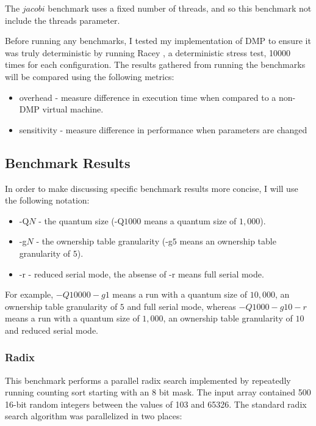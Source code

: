 The $jacobi$ benchmark uses a fixed number of threads, and so this
benchmark not include the threads parameter.

Before running any benchmarks, I tested my implementation of DMP to
ensure it was truly deterministic by running Racey \cite{racey}, a
deterministic stress test, 10000 times for each configuration.  The
results gathered from running the benchmarks will be compared using
the following metrics:

\begin{itemize}
\item overhead - measure difference in execution time when compared to
  a non-DMP virtual machine.

\item sensitivity - measure difference in performance when parameters
  are changed
\end{itemize}

\subsection{Benchmark Results}

In order to make discussing specific benchmark results more concise, I
will use the following notation:

\begin{itemize}
\item -Q$N$ - the quantum size (-Q$1000$ means a quantum size of
  $1,000$).

\item -g$N$ - the ownership table granularity (-g$5$ means an
  ownership table granularity of $5$).

\item -r - reduced serial mode, the absense of -r means full serial
  mode.
\end{itemize}

For example, $-Q10000 -g1$ means a run with a quantum size of
$10,000$, an ownership table granularity of $5$ and full serial mode,
whereas $-Q1000 -g10 -r$ means a run with a quantum size of $1,000$,
an ownership table granularity of $10$ and reduced serial mode.

\subsubsection{Radix}

This benchmark performs a parallel radix search implemented by
repeatedly running counting sort starting with an 8 bit mask.  The
input array contained 500 16-bit random integers between the values of
103 and 65326.  The standard radix search algorithm was parallelized
in two places:

